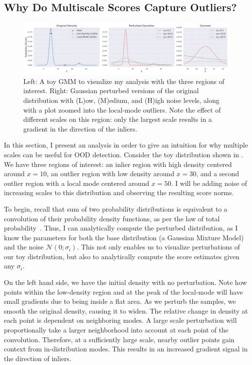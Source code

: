 \subsection*{Why Do Multiscale Scores Capture Outliers?}
\label{neighborhoods}
\begin{figure}[tbhp]
\centering
\includegraphics[width=\linewidth]{figures/gmm_plot_tight.png}
\caption{Left: A toy GMM to visualize my analysis with the three regions of interest. Right: Gaussian perturbed versions of the original distribution with (L)ow, (M)edium, and (H)igh noise levels, along with a plot zoomed into the local-mode outliers. Note the effect of different scales on this region: only the largest scale results in a gradient in the direction of the inliers.}
\label{fig:toygmm}
\end{figure}

 In this section, I present an analysis in order to give an intuition for why multiple scales can be useful for OOD detection. Consider the toy distribution shown in . We have three regions of interest: an inlier region with high density centered around $x=10$, an outlier region with low density around $x=30$, and a second outlier region with a local mode centered around $x=50$. I will be adding noise of increasing scales to this distribution and observing the resulting score norms.

To begin, recall that sum of two probability distributions is equivalent to a convolution of their probability density functions, as per the law of total probability~\cite{sumisconv}. Thus, I can analytically compute the perturbed distribution, as I know the parameters for both the base distribution (a Gaussian Mixture Model) and the noise $\mathcal{N}(0; \sigma_i)$. 
This not only enables us to visualize perturbations of our toy distribution, but also to analytically compute the score estimates given any $\sigma_i$.

On the left hand side, we have the initial density with no perturbation. Note how points within the low-density region and at the peak of the local-mode will have small gradients due to being inside a flat area. As we perturb the samples, we smooth the original density, causing it to widen. The relative change in density at each point is dependent on neighboring modes. A large scale perturbation will proportionally take a larger neighborhood into account at each point of the convolution. Therefore, at a sufficiently large scale, nearby outlier points gain context from in-distribution modes. This results in an increased gradient signal in the direction of inliers. 

